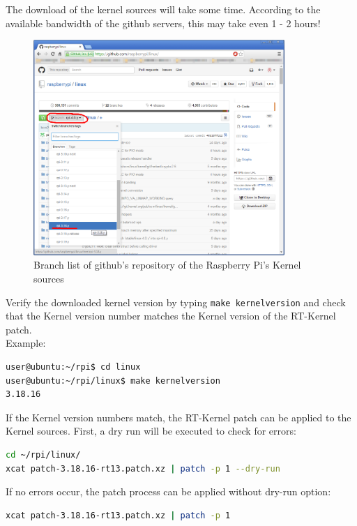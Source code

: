 The download of the kernel sources will take some time. According to the available bandwidth of the github servers, this may take even 1 - 2 hours!

\begin{figure}[H]
    \centering
    \includegraphics[width=0.85\textwidth]{fig/ch-rt-linux-os/githubBranchesBrowser}
    \caption[Branch list of github's Raspberry Pi Kernel sources]{Branch list of github's repository of the Raspberry Pi's Kernel sources}
    \label{fig:OS:preemptRtPatch:githubBrowser}
\end{figure}

Verify the downloaded kernel version by typing \texttt{make kernelversion} and check that the Kernel version number matches the Kernel version of the RT-Kernel patch.\\
Example:
\begin{lstlisting}[language=bash,otherkeywords={make, xcat,cd,dd,sudo}]
user@ubuntu:~/rpi$ cd linux
user@ubuntu:~/rpi/linux$ make kernelversion
3.18.16
\end{lstlisting}

If the Kernel version numbers match, the RT-Kernel patch can be applied to the Kernel sources. First, a dry run will be executed to check for errors:
\begin{lstlisting}[language=bash,otherkeywords={xcat,cd,dd,sudo}]
cd ~/rpi/linux/
xcat patch-3.18.16-rt13.patch.xz | patch -p 1 --dry-run
\end{lstlisting}

If no errors occur, the patch process can be applied without dry-run option:
\begin{lstlisting}[language=bash,otherkeywords={xcat,dd,sudo}]
xcat patch-3.18.16-rt13.patch.xz | patch -p 1
\end{lstlisting}

